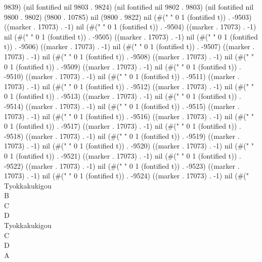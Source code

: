 9839) (nil fontified nil 9803 . 9824) (nil fontified nil 9802 . 9803) (nil fontified nil 9800 . 9802) (9800 . 10785) nil (9800 . 9822) nil (#("
" 0 1 (fontified t)) . -9503) ((marker . 17073) . -1) nil (#(" " 0 1 (fontified t)) . -9504) ((marker . 17073) . -1) nil (#(" " 0 1 (fontified t)) . -9505) ((marker . 17073) . -1) nil (#(" " 0 1 (fontified t)) . -9506) ((marker . 17073) . -1) nil (#(" " 0 1 (fontified t)) . -9507) ((marker . 17073) . -1) nil (#(" " 0 1 (fontified t)) . -9508) ((marker . 17073) . -1) nil (#(" " 0 1 (fontified t)) . -9509) ((marker . 17073) . -1) nil (#(" " 0 1 (fontified t)) . -9510) ((marker . 17073) . -1) nil (#(" " 0 1 (fontified t)) . -9511) ((marker . 17073) . -1) nil (#(" " 0 1 (fontified t)) . -9512) ((marker . 17073) . -1) nil (#(" " 0 1 (fontified t)) . -9513) ((marker . 17073) . -1) nil (#(" " 0 1 (fontified t)) . -9514) ((marker . 17073) . -1) nil (#(" " 0 1 (fontified t)) . -9515) ((marker . 17073) . -1) nil (#(" " 0 1 (fontified t)) . -9516) ((marker . 17073) . -1) nil (#(" " 0 1 (fontified t)) . -9517) ((marker . 17073) . -1) nil (#(" " 0 1 (fontified t)) . -9518) ((marker . 17073) . -1) nil (#(" " 0 1 (fontified t)) . -9519) ((marker . 17073) . -1) nil (#(" " 0 1 (fontified t)) . -9520) ((marker . 17073) . -1) nil (#(" " 0 1 (fontified t)) . -9521) ((marker . 17073) . -1) nil (#(" " 0 1 (fontified t)) . -9522) ((marker . 17073) . -1) nil (#(" " 0 1 (fontified t)) . -9523) ((marker . 17073) . -1) nil (#(" " 0 1 (fontified t)) . -9524) ((marker . 17073) . -1) nil (#(" \\Tyokkakukigou\\B\\C\\D
                      \\Tyokkakukigou\\C\\D\\A
